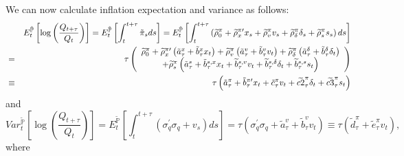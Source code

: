\documentclass{article}
\begin{document}
We can now calculate inflation expectation and variance as follows:%
\begin{eqnarray*}
&&E_{t}^{\mathbb{\tilde{P}}}\left[ \log \left( \frac{Q_{t+\tau }}{Q_{t}}%
\right) \right] =E_{t}^{\mathbb{\tilde{P}}}\left[ \int_{t}^{t+\tau }\tilde{%
\pi}_{s}ds\right] =E_{t}^{\mathbb{\tilde{P}}}\left[ \int_{t}^{t+\tau }\left( 
\widetilde{\rho }_{0}^{\pi }+\widetilde{\rho }_{x}^{\pi \prime }x_{s}+%
\widetilde{\rho }_{v}^{\pi }v_{s}+\widetilde{\rho }_{\delta }^{\pi }\delta
_{s}+\widetilde{\rho }_{s}^{\pi }s_{s}\right) ds\right] \\
&=&\tau \left( 
\begin{array}{c}
\widetilde{\rho }_{0}^{\pi }+\widetilde{\rho }_{x}^{\pi \prime }\left( 
\tilde{a}_{\tau }^{x}+\tilde{b}_{\tau }^{x}x_{t}\right) +\widetilde{\rho }%
_{v}^{\pi }\left( \tilde{a}_{\tau }^{v}+\tilde{b}_{\tau }^{v}v_{t}\right) +%
\widetilde{\rho }_{\delta }^{\pi }\left( \tilde{a}_{\tau }^{\delta }+\tilde{b%
}_{\tau }^{\delta }\delta _{t}\right) \\ 
+\widetilde{\rho }_{s}^{\pi }\left( \tilde{a}_{\tau }^{s}+\tilde{b}_{\tau
}^{s,x}x_{t}+\widetilde{b}_{\tau }^{s,v}v_{t}+\widetilde{b}_{\tau
}^{s,\delta }\delta _{t}+\widetilde{b}_{\tau }^{s,s}s_{t}\right)%
\end{array}%
\right) \\
&\equiv &\tau \left( \tilde{a}_{\tau }^{\pi }+\tilde{b}_{\tau }^{\pi \prime
}x_{t}+\tilde{c}_{\tau }^{\pi }v_{t}+\widetilde{c2}_{\tau }^{\pi }\delta
_{t}+\widetilde{c3}_{\tau }^{\pi }s_{t}\right)
\end{eqnarray*}%
and%
\begin{equation*}
Var_{t}^{\mathbb{\tilde{P}}}\left[ \log \left( \frac{Q_{t+\tau }}{Q_{t}}%
\right) \right] =E_{t}^{\mathbb{\tilde{P}}}\left[ \int_{t}^{t+\tau }\left(
\sigma _{q}^{\prime }\sigma _{q}+v_{s}\right) ds\right] =\tau \left( \sigma
_{q}^{\prime }\sigma _{q}+\tilde{a}_{\tau }^{v}+\tilde{b}_{\tau
}^{v}v_{t}\right) \equiv \tau \left( \tilde{d}_{\tau }^{\pi }+\tilde{e}%
_{\tau }^{\pi }v_{t}\right) ,
\end{equation*}%
where 
\end{document}
